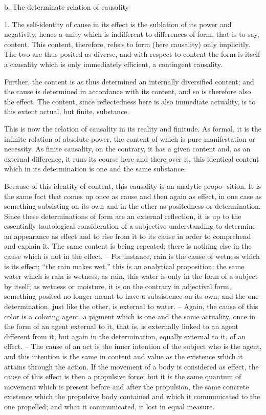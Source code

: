 b. The determinate relation of causality

1. The self-identity of cause in its effect is
the sublation of its power and negativity,
hence a unity which is indifferent to differences of form,
that is to say, content.
This content, therefore, refers to form (here causality)
only implicitly.
The two are thus posited as diverse,
and with respect to content the form is itself
a causality which is only immediately efficient,
a contingent causality.

Further, the content is as thus determined
an internally diversified content;
and the cause is determined in accordance with its content,
and so is therefore also the effect.
The content, since reflectedness here is also immediate actuality,
is to this extent actual, but finite, substance.

This is now the relation of causality in its reality and finitude.
As formal, it is the infinite relation of absolute power,
the content of which is pure manifestation or necessity.
As finite causality, on the contrary, it has a given content
and, as an external difference, it runs its course here
and there over it, this identical content
which in its determination is one and the same substance.

Because of this identity of content, this causality is an analytic propo-
sition. It is the same fact that comes up once as cause and then again as
effect, in one case as something subsisting on its own and in the other
as positedness or determination. Since these determinations of form are
an external reflection, it is up to the essentially tautological consideration
of a subjective understanding to determine an appearance as effect and to
rise from it to its cause in order to comprehend and explain it. The same
content is being repeated; there is nothing else in the cause which is not in
the effect. – For instance, rain is the cause of wetness which is its effect; “the
rain makes wet,” this is an analytical proposition; the same water which is
rain is wetness; as rain, this water is only in the form of a subject by itself;
as wetness or moisture, it is on the contrary in adjectival form, something
posited no longer meant to have a subsistence on its own; and the one
determination, just like the other, is external to water. – Again, the cause of
this color is a coloring agent, a pigment which is one and the same actuality,
once in the form of an agent external to it, that is, is externally linked to
an agent different from it; but again in the determination, equally external
to it, of an effect. – The cause of an act is the inner intention of the subject
who is the agent, and this intention is the same in content and value as the
existence which it attains through the action. If the movement of a body
is considered as effect, the cause of this effect is then a propulsive force;
but it is the same quantum of movement which is present before and after
the propulsion, the same concrete existence which the propulsive body
contained and which it communicated to the one propelled; and what it
communicated, it lost in equal measure.

